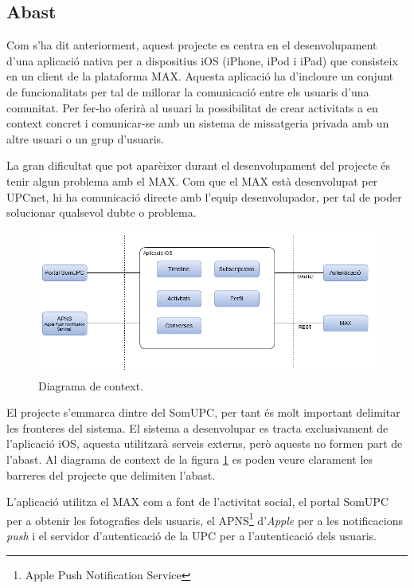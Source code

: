 \subsection{Abast}

Com s'ha dit anteriorment, aquest projecte es centra en el desenvolupament d'una aplicació nativa per a dispositius iOS (iPhone, iPod i iPad) que consisteix en un client de la plataforma MAX. Aquesta aplicació ha d'incloure un conjunt de funcionalitats per tal de millorar la comunicació entre els usuaris d'una comunitat. Per fer-ho oferirà al usuari la possibilitat de crear activitats a en context concret i comunicar-se amb un sistema de missatgeria privada amb un altre usuari o un grup d'usuaris.

La gran dificultat que pot aparèixer durant el desenvolupament del projecte és tenir algun problema amb el MAX. Com que el MAX està desenvolupat per UPCnet, hi ha comunicació directe amb l'equip desenvolupador, per tal de poder solucionar qualsevol dubte o problema.

\begin{figure}[ht]
    \centering
    \includegraphics[scale=0.7]{Analisis/Abast/diagrama_context.png}
    \caption{Diagrama de context.}
    \label{fig:diagrama_context}
\end{figure}
\FloatBarrier

El projecte s'emmarca dintre del SomUPC, per tant és molt important delimitar les fronteres del sistema. El sistema a desenvolupar es tracta exclusivament de l'aplicació iOS, aquesta utilitzarà serveis externs, però aquests no formen part de l'abast. Al diagrama de context de la figura \ref{fig:diagrama_context} es poden veure clarament les barreres del projecte que delimiten l'abast.

L'aplicació utilitza el MAX com a font de l'activitat social, el portal SomUPC per a obtenir les fotografies dels usuaris, el APNS\footnote{Apple Push Notification Service} d'\textit{Apple} per a les notificacions \textit{push} i el servidor d'autenticació de la UPC per a l'autenticació dels usuaris.

